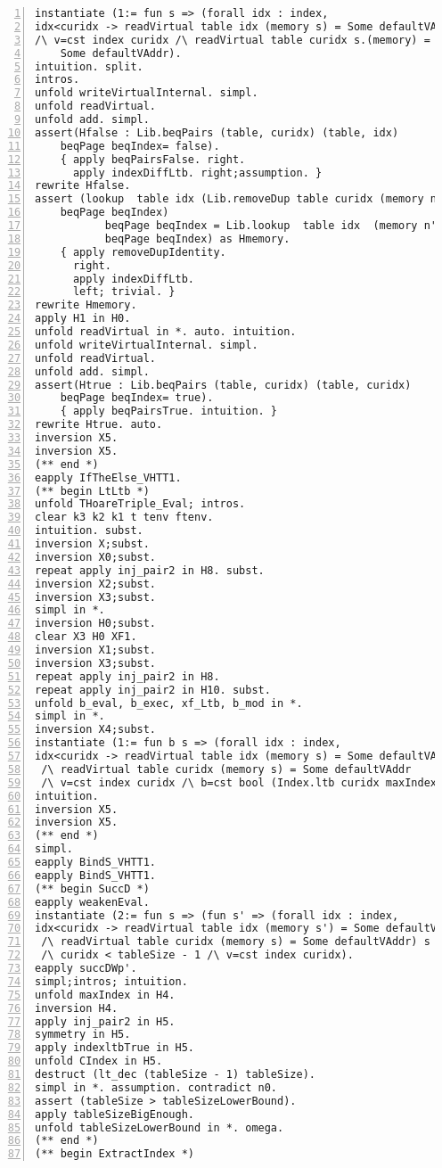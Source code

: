 \begin{appendices}
\begin{lstlisting}[xleftmargin=-.1\textwidth,
xrightmargin=-.1\textwidth,
mathescape=true,numbers=left]
instantiate (1:= fun s => (forall idx : index,
idx<curidx -> readVirtual table idx (memory s) = Some defaultVAddr) 
/\ v=cst index curidx /\ readVirtual table curidx s.(memory) = 
    Some defaultVAddr).
intuition. split.
intros.
unfold writeVirtualInternal. simpl.
unfold readVirtual.
unfold add. simpl.
assert(Hfalse : Lib.beqPairs (table, curidx) (table, idx) 
	beqPage beqIndex= false).
    { apply beqPairsFalse. right.
      apply indexDiffLtb. right;assumption. }
rewrite Hfalse.
assert (lookup  table idx (Lib.removeDup table curidx (memory n') 
	beqPage beqIndex)
           beqPage beqIndex = Lib.lookup  table idx  (memory n') 
           beqPage beqIndex) as Hmemory.
    { apply removeDupIdentity.
      right. 
      apply indexDiffLtb.
      left; trivial. }
rewrite Hmemory.
apply H1 in H0.
unfold readVirtual in *. auto. intuition.
unfold writeVirtualInternal. simpl.
unfold readVirtual.
unfold add. simpl.
assert(Htrue : Lib.beqPairs (table, curidx) (table, curidx) 
	beqPage beqIndex= true).
    { apply beqPairsTrue. intuition. }
rewrite Htrue. auto.
inversion X5.
inversion X5.
(** end *)
eapply IfTheElse_VHTT1.
(** begin LtLtb *)
unfold THoareTriple_Eval; intros.
clear k3 k2 k1 t tenv ftenv.
intuition. subst.
inversion X;subst.
inversion X0;subst.
repeat apply inj_pair2 in H8. subst.
inversion X2;subst.
inversion X3;subst.
simpl in *.
inversion H0;subst.
clear X3 H0 XF1.
inversion X1;subst.
inversion X3;subst.
repeat apply inj_pair2 in H8.
repeat apply inj_pair2 in H10. subst.
unfold b_eval, b_exec, xf_Ltb, b_mod in *.
simpl in *.
inversion X4;subst.
instantiate (1:= fun b s => (forall idx : index,
idx<curidx -> readVirtual table idx (memory s) = Some defaultVAddr)
 /\ readVirtual table curidx (memory s) = Some defaultVAddr 
 /\ v=cst index curidx /\ b=cst bool (Index.ltb curidx maxIndex)).
intuition.
inversion X5.
inversion X5.
(** end *)
simpl.
eapply BindS_VHTT1.
eapply BindS_VHTT1.
(** begin SuccD *)
eapply weakenEval.
instantiate (2:= fun s => (fun s' => (forall idx : index,
idx<curidx -> readVirtual table idx (memory s') = Some defaultVAddr) 
 /\ readVirtual table curidx (memory s) = Some defaultVAddr) s 
 /\ curidx < tableSize - 1 /\ v=cst index curidx).
eapply succDWp'.
simpl;intros; intuition.
unfold maxIndex in H4.
inversion H4.
apply inj_pair2 in H5.
symmetry in H5.
apply indexltbTrue in H5.
unfold CIndex in H5.
destruct (lt_dec (tableSize - 1) tableSize). 
simpl in *. assumption. contradict n0.
assert (tableSize > tableSizeLowerBound).
apply tableSizeBigEnough.
unfold tableSizeLowerBound in *. omega.
(** end *) 
(** begin ExtractIndex *)

\end{lstlisting}
\end{appendices}
